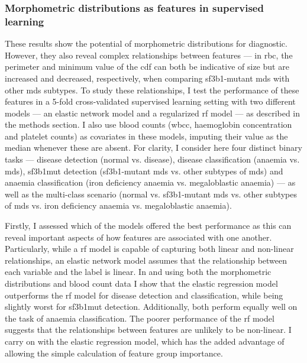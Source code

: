 \begin{figure}[!ht]
    \label{fig:feature-distribution-mean}
\end{figure}

\subsubsection{Morphometric distributions as features in supervised learning}

These results show the potential of morphometric distributions for diagnostic. However, they also reveal complex relationships between features --- in \ac{rbc}, the perimeter and minimum value of the \ac{cdf} can both be indicative of size but are increased and decreased, respectively, when comparing \ac{sf3b1}-mutant \ac{mds} with other \ac{mds} subtypes. To study these relationships, I test the performance of these features in a 5-fold cross-validated supervised learning setting with two different models --- an elastic network model and a regularized \ac{rf} model --- as described in the methods section. I also use blood counts (\ac{wbcc}, haemoglobin concentration and platelet counts) as covariates in these models, imputing their value as the median whenever these are absent. For clarity, I consider here four distinct binary tasks --- disease detection (normal vs. disease), disease classification (anaemia vs. \ac{mds}), \ac{sf3b1}mut detection (\ac{sf3b1}-mutant \ac{mds} vs. other subtypes of \ac{mds}) and anaemia classification (iron deficiency anaemia vs. megaloblastic anaemia) --- as well as the multi-class scenario (normal vs. \ac{sf3b1}-mutant \ac{mds} vs. other subtypes of \ac{mds} vs. iron deficiency anaemia vs. megaloblastic anaemia). 

Firstly, I assessed which of the models offered the best performance as this can reveal important aspects of how features are associated with one another. Particularly, while a \ac{rf} model is capable of capturing both linear and non-linear relationships, an elastic network model assumes that the relationship between each variable and the label is linear. In  and using both the morphometric distributions and blood count data I show that the elastic regression model outperforms the \ac{rf} model for disease detection and classification, while being slightly worst for \ac{sf3b1}mut detection. Additionally, both perform equally well on the task of anaemia classification. The poorer performance of the \ac{rf} model suggests that the relationships between features are unlikely to be non-linear. I carry on with the elastic regression model, which has the added advantage of allowing the simple calculation of feature group importance.

